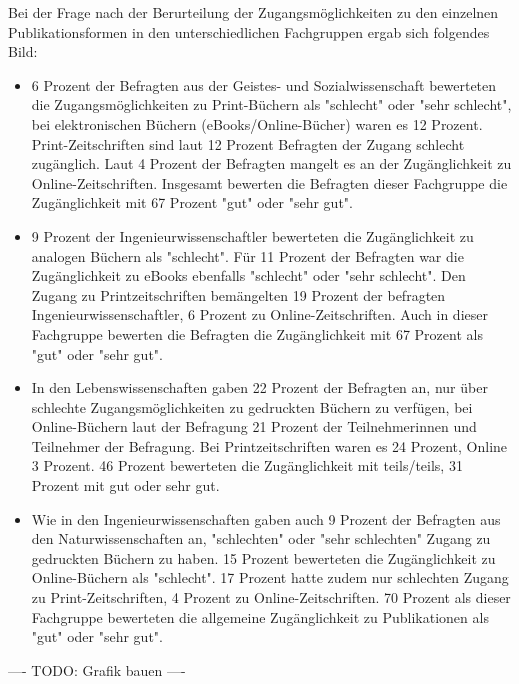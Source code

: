 Bei der Frage nach der Berurteilung der Zugangsmöglichkeiten zu den einzelnen Publikationsformen in den unterschiedlichen Fachgruppen ergab sich folgendes Bild:
\begin{itemize}
\item 6 Prozent der Befragten aus der Geistes- und Sozialwissenschaft bewerteten die Zugangsmöglichkeiten zu Print-Büchern als "schlecht" oder "sehr schlecht", bei elektronischen Büchern (eBooks/Online-Bücher) waren es 12 Prozent. Print-Zeitschriften sind laut 12 Prozent Befragten der Zugang schlecht zugänglich. Laut 4 Prozent der Befragten mangelt es an der Zugänglichkeit zu Online-Zeitschriften. Insgesamt bewerten die Befragten dieser Fachgruppe die Zugänglichkeit mit 67 Prozent "gut" oder "sehr gut".
\item 9 Prozent der Ingenieurwissenschaftler bewerteten die Zugänglichkeit zu analogen Büchern als "schlecht". Für 11 Prozent der Befragten war die Zugänglichkeit zu eBooks ebenfalls "schlecht" oder "sehr schlecht". Den Zugang zu Printzeitschriften bemängelten 19 Prozent der befragten Ingenieurwissenschaftler, 6 Prozent zu Online-Zeitschriften. Auch in dieser Fachgruppe bewerten die Befragten die Zugänglichkeit mit 67 Prozent als "gut" oder "sehr gut".
\item In den Lebenswissenschaften gaben 22 Prozent der Befragten an, nur über schlechte Zugangsmöglichkeiten zu gedruckten Büchern zu verfügen, bei Online-Büchern laut der Befragung 21 Prozent der Teilnehmerinnen und Teilnehmer der Befragung. Bei Printzeitschriften waren es 24 Prozent, Online 3 Prozent. 46 Prozent bewerteten die Zugänglichkeit mit teils/teils, 31 Prozent mit gut oder sehr gut.
\item Wie in den Ingenieurwissenschaften gaben auch 9 Prozent der Befragten aus den Naturwissenschaften an, "schlechten" oder "sehr schlechten" Zugang zu gedruckten Büchern zu haben. 15 Prozent bewerteten die Zugänglichkeit zu Online-Büchern als "schlecht". 17 Prozent hatte zudem nur schlechten Zugang zu Print-Zeitschriften, 4 Prozent zu Online-Zeitschriften. 70 Prozent als dieser Fachgruppe bewerteten die allgemeine Zugänglichkeit zu Publikationen als "gut" oder "sehr gut".
\end{itemize}

---- TODO: Grafik bauen ----

